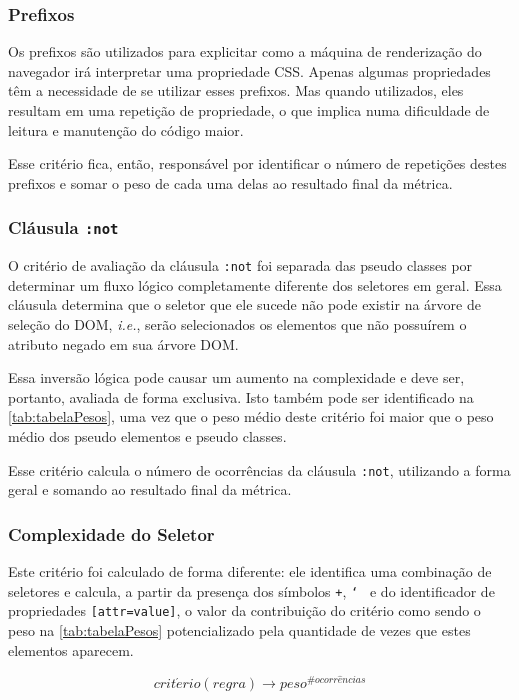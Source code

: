 \subsubsection{Prefixos}
Os prefixos são utilizados para explicitar como a máquina de renderização do navegador irá interpretar uma propriedade CSS. Apenas algumas propriedades têm a necessidade de se utilizar esses prefixos. Mas quando utilizados, eles resultam em uma repetição de propriedade, o que implica numa dificuldade de leitura e manutenção do código maior.

Esse critério fica, então, responsável por identificar o número de repetições destes prefixos e somar o peso de cada uma delas ao resultado final da métrica.

\subsubsection{Cláusula \texttt{:not}}
O critério de avaliação da cláusula \texttt{:not} foi separada das pseudo classes por determinar um fluxo lógico completamente diferente dos seletores em geral. Essa cláusula determina que o seletor que ele sucede não pode existir na árvore de seleção do DOM, \textit{i.e.}, serão selecionados os elementos que não possuírem o atributo negado em sua árvore DOM.

Essa inversão lógica pode causar um aumento na complexidade e deve ser, portanto, avaliada de forma exclusiva. Isto também pode ser identificado na \autoref{tab:tabelaPesos}, uma vez que o peso médio deste critério foi maior que o peso médio dos pseudo elementos e pseudo classes.

Esse critério calcula o número de ocorrências da cláusula \texttt{:not}, utilizando a forma geral e somando ao resultado final da métrica.

\subsubsection{Complexidade do Seletor}
Este critério foi calculado de forma diferente: ele identifica uma combinação de seletores e calcula, a partir da presença dos símbolos \texttt{+}, \texttt{\char`~} e do identificador de propriedades \texttt{[attr=value]}, o valor da contribuição do critério como sendo o peso na \autoref{tab:tabelaPesos} potencializado pela quantidade de vezes que estes elementos aparecem.

\begin{equation}
\label{math:complexity}
	crit\acute{e}rio(regra) \rightarrow peso^{\#ocorr\hat{e}ncias}
\end{equation}

